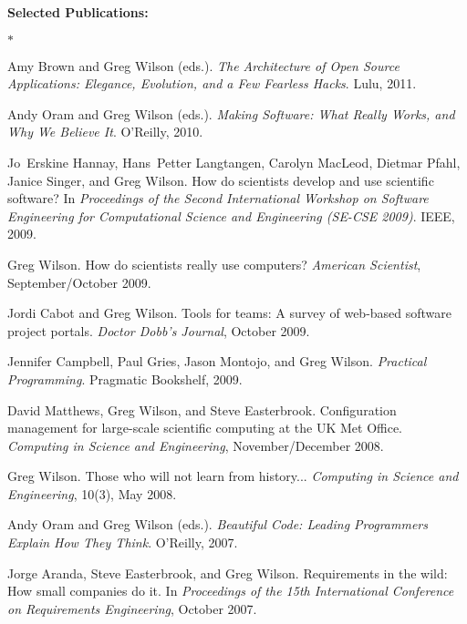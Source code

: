 \documentclass{proposalnsf}
\newlength{\up}
\begin{document}
\textbf{Selected Publications:} %
%
\vspace{\up}
\begin{list}{$\ast$}{\setlength{\leftmargin}{1em}}

\item
Amy Brown and Greg Wilson (eds.).
{\em The Architecture of Open Source Applications: Elegance, Evolution, and a Few Fearless Hacks}.
Lulu, 2011.

\item
Andy Oram and Greg Wilson (eds.).
{\em Making Software: What Really Works, and Why We Believe It}.
O'Reilly, 2010.

\item
Jo~Erskine Hannay, Hans~Petter Langtangen, Carolyn MacLeod, Dietmar Pfahl, Janice Singer, and Greg Wilson.
How do scientists develop and use scientific software?
In {\em Proceedings of the Second International Workshop on Software Engineering for Computational Science and Engineering (SE-CSE 2009)}. IEEE, 2009.

\item
Greg Wilson.
How do scientists really use computers?
{\em American Scientist}, September/October 2009.

\item
Jordi Cabot and Greg Wilson.
Tools for teams: A survey of web-based software project portals.
{\em Doctor Dobb's Journal}, October 2009.

\item
Jennifer Campbell, Paul Gries, Jason Montojo, and Greg Wilson.
{\em Practical Programming}.
Pragmatic Bookshelf, 2009.

\item
David Matthews, Greg Wilson, and Steve Easterbrook.
Configuration management for large-scale scientific computing at the UK Met Office.
{\em Computing in Science and Engineering}, November/December 2008.

\item
Greg Wilson.
Those who will not learn from history...
{\em Computing in Science and Engineering}, 10(3), May 2008.

\item
Andy Oram and Greg Wilson (eds.).
{\em Beautiful Code: Leading Programmers Explain How They Think}.
O'Reilly, 2007.

\item
Jorge Aranda, Steve Easterbrook, and Greg Wilson.
Requirements in the wild: How small companies do it.
In {\em Proceedings of the 15th International Conference on Requirements Engineering}, October 2007.


\end{list}
\end{document}
